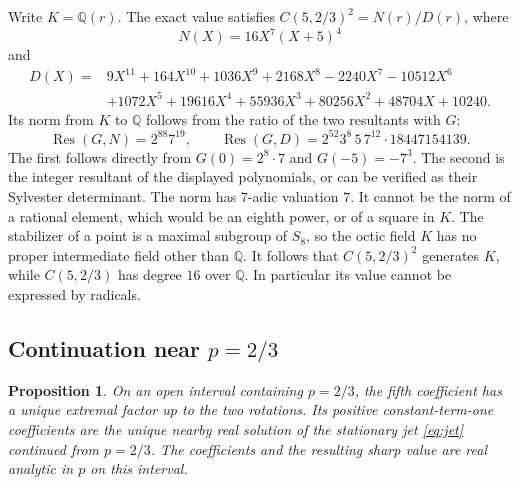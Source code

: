 \documentclass[11pt]{article}
\newtheorem{proposition}[theorem]{Proposition}
\begin{document}
Write \(K=\mathbb Q(r)\). The exact value satisfies
\(C(5,2/3)^2=N(r)/D(r)\), where
\[
 N(X)=16X^7(X+5)^4
\]
and
\begin{align*}
 D(X)={}&9X^{11}+164X^{10}+1036X^9+2168X^8-2240X^7-10512X^6\\
 &+1072X^5+19616X^4+55936X^3+80256X^2+48704X+10240 .
\end{align*}
Its norm from \(K\) to \(\mathbb Q\) follows from the ratio of the
two resultants with \(G\):
\[
 \operatorname{Res}(G,N)=2^{88}7^{19},\qquad
 \operatorname{Res}(G,D)=2^{52}3^8\,5\,7^{12}\cdot18447154139 .
\]
The first follows directly from \(G(0)=2^8\cdot7\) and
\(G(-5)=-7^3\). The second is the integer resultant of the displayed
polynomials, or can be verified as their Sylvester determinant.
The norm has \(7\)-adic valuation \(7\). It cannot be the norm of a
rational element, which would be an eighth power, or of a square
in \(K\). The stabilizer of a point is a maximal subgroup of \(S_8\),
so the octic field \(K\) has no proper intermediate field other
than \(\mathbb Q\). It follows that \(C(5,2/3)^2\) generates \(K\),
while \(C(5,2/3)\) has degree \(16\) over \(\mathbb Q\).
In particular its value cannot be expressed by radicals.


\subsection{Continuation near \texorpdfstring{\(p=2/3\)}{p=2/3}}

\begin{proposition}\label{prop:continue-five}
On an open interval containing \(p=2/3\), the fifth coefficient
has a unique extremal factor up to the two rotations. Its positive
constant-term-one coefficients are the unique nearby real solution
of the stationary jet \eqref{eq:jet} continued from \(p=2/3\).
The coefficients and the resulting sharp value are real analytic
in \(p\) on this interval.
\end{proposition}
\end{document}
